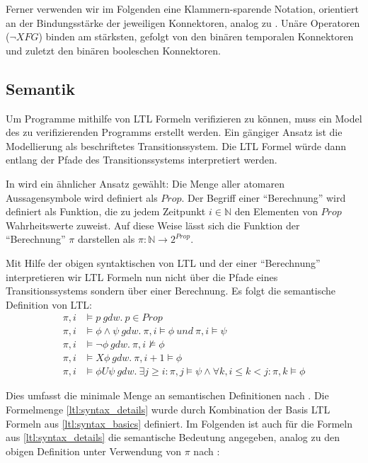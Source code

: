 Ferner verwenden wir im Folgenden eine Klammern-sparende Notation, orientiert an der Bindungsstärke der jeweiligen Konnektoren, analog zu \cite{huth+04}. Unäre Operatoren ($\lnot X F G$) binden am stärksten, gefolgt von den binären temporalen Konnektoren und zuletzt den binären booleschen Konnektoren.


\subsection{Semantik}

Um Programme mithilfe von LTL Formeln verifizieren zu können, muss ein Model des zu verifizierenden Programms erstellt werden. Ein gängiger Ansatz ist die Modellierung als beschriftetes Transitionssystem\cite{huth+04}. Die LTL Formel würde dann entlang der Pfade des Transitionssystems interpretiert werden. 

In \cite{vardi+96} wird ein ähnlicher Ansatz gewählt: Die Menge aller atomaren Aussagensymbole wird definiert als $Prop$. Der Begriff einer "`Berechnung"' wird definiert als Funktion, die zu jedem Zeitpunkt $i \in \mathbb{N}$ den Elementen von $Prop$ Wahrheitswerte zuweist. Auf diese Weise lässt sich die Funktion der "`Berechnung"' $\pi$ darstellen als $\pi : \mathbb{N} \rightarrow 2^{Prop}$. 

Mit Hilfe der obigen syntaktischen von LTL und der einer "`Berechnung"' interpretieren wir LTL Formeln nun nicht über die Pfade eines Transitionssystems sondern über einer Berechnung. Es folgt die semantische Definition von LTL: 
\begin{equation*}
\begin{split}
    \pi, i &\models p\ gdw.\ p \in Prop\\
    \pi, i &\models \phi \land \psi\ gdw.\ \pi, i \models \phi\ und\ \pi, i \models \psi\\
    \pi, i &\models \lnot\phi\ gdw.\ \pi, i \not\models \phi\\
    \pi, i &\models X\phi\ gdw.\ \pi, i+1 \models \phi\\
    \pi, i &\models \phi U\psi\ gdw.\ \exists j \geq i: \pi, j \models \psi \land \forall k, i\leq k<j: \pi, k \models \phi
\end{split}
\end{equation*}

Dies umfasst die minimale Menge an semantischen Definitionen nach \cite{vardi+96}. Die Formelmenge \ref{ltl:syntax_details} wurde durch Kombination der Basis LTL Formeln aus \ref{ltl:syntax_basics} definiert. Im Folgenden ist auch für die Formeln aus \ref{ltl:syntax_details} die semantische Bedeutung angegeben, analog zu den obigen Definition unter Verwendung von $\pi$ nach \cite{vardi+96}:


